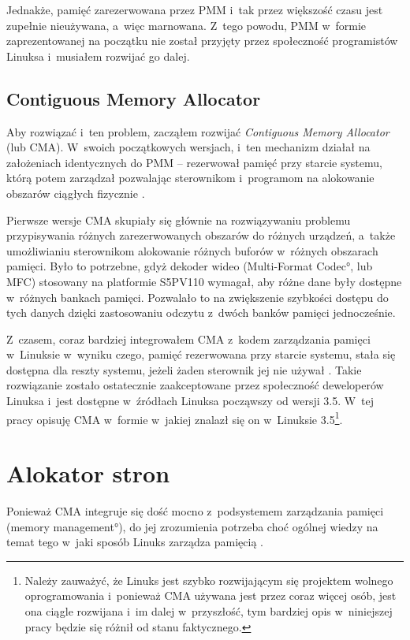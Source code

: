 Jednakże, pamięć zarezerwowana przez PMM i~tak przez większość czasu
jest zupełnie nieużywana, a~więc marnowana.  Z~tego powodu, PMM
w~formie zaprezentowanej na początku nie został przyjęty przez
społeczność programistów Linuksa i~musiałem rozwijać go dalej.

\section{Contiguous Memory Allocator}\label{sec:cma}

Aby rozwiązać i~ten problem, zacząłem rozwijać {\it Contiguous Memory
  Allocator} (lub CMA).  W~swoich początkowych wersjach, i~ten
mechanizm działał na założeniach identycznych do PMM -- rezerwował
pamięć przy starcie systemu, którą potem zarządzał pozwalając
sterownikom i~programom na alokowanie obszarów ciągłych fizycznie
\cite{patch:cma-4}.

Pierwsze wersje CMA skupiały się głównie na rozwiązywaniu problemu
przypisywania różnych zarezerwowanych obszarów do różnych urządzeń,
a~także umożliwianiu sterownikom alokowanie różnych buforów w~różnych
obszarach pamięci.  Było to potrzebne, gdyż dekoder wideo
(\ang{Multi-Format Codec}, lub MFC) stosowany na platformie S5PV110
wymagał, aby różne dane były dostępne w~różnych bankach pamięci.
Pozwalało to na zwiększenie szybkości dostępu do tych danych dzięki
zastosowaniu odczytu z~dwóch banków pamięci jednocześnie.

Z~czasem, coraz bardziej integrowałem CMA z~kodem zarządzania pamięci
w~Linuksie w~wyniku czego, pamięć rezerwowana przy starcie systemu,
stała się dostępna dla reszty systemu, jeżeli żaden sterownik jej nie
używał \cite{patch:cma-24}.  Takie rozwiązanie zostało ostatecznie
zaakceptowane przez społeczność deweloperów Linuksa i~jest dostępne
w~źródłach Linuksa począwszy od wersji 3.5.  W~tej pracy opisuję CMA
w~formie w~jakiej znalazł się on w~Linuksie 3.5\footnote{Należy
  zauważyć, że Linuks jest szybko rozwijającym się projektem wolnego
  oprogramowania i~ponieważ CMA używana jest przez coraz więcej osób,
  jest ona ciągle rozwijana i~im dalej w~przyszłość, tym bardziej opis
  w~niniejszej pracy będzie się różnił od stanu faktycznego.}.


\chapter{Alokator stron}

Ponieważ CMA integruje się dość mocno z~podsystemem zarządzania
pamięci (\ang{memory management}), do jej zrozumienia potrzeba
choć ogólnej wiedzy na temat tego w~jaki sposób Linuks zarządza
pamięcią .

